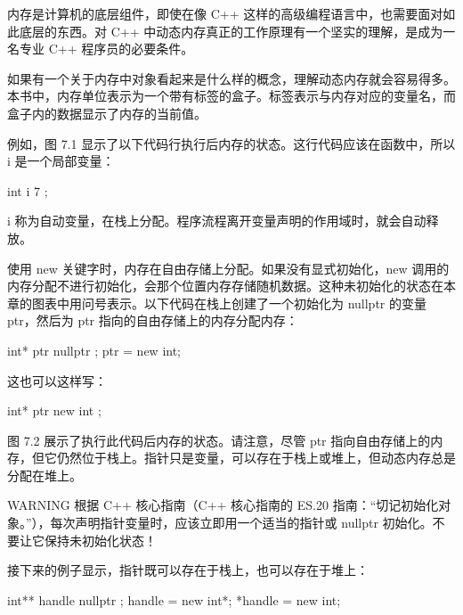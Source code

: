 
内存是计算机的底层组件，即使在像 C++ 这样的高级编程语言中，也需要面对如此底层的东西。对 C++ 中动态内存真正的工作原理有一个坚实的理解，是成为一名专业 C++ 程序员的必要条件。


如果有一个关于内存中对象看起来是什么样的概念，理解动态内存就会容易得多。本书中，内存单位表示为一个带有标签的盒子。标签表示与内存对应的变量名，而盒子内的数据显示了内存的当前值。

例如，图 7.1 显示了以下代码行执行后内存的状态。这行代码应该在函数中，所以 i 是一个局部变量：

\begin{cpp}
int i { 7 };
\end{cpp}


i 称为自动变量，在栈上分配。程序流程离开变量声明的作用域时，就会自动释放。

使用 new 关键字时，内存在自由存储上分配。如果没有显式初始化，new 调用的内存分配不进行初始化，会那个位置内存存储随机数据。这种未初始化的状态在本章的图表中用问号表示。以下代码在栈上创建了一个初始化为 nullptr 的变量 ptr，然后为 ptr 指向的自由存储上的内存分配内存：

\begin{cpp}
int* ptr { nullptr };
ptr = new int;
\end{cpp}

这也可以这样写：

\begin{cpp}
int* ptr { new int };
\end{cpp}


图 7.2 展示了执行此代码后内存的状态。请注意，尽管 ptr 指向自由存储上的内存，但它仍然位于栈上。指针只是变量，可以存在于栈上或堆上，但动态内存总是分配在堆上。

\begin{myWarning}{WARNING}
根据 C++ 核心指南（C++ 核心指南的 ES.20 指南：“切记初始化对象。”），每次声明指针变量时，应该立即用一个适当的指针或 nullptr 初始化。不要让它保持未初始化状态！
\end{myWarning}

接下来的例子显示，指针既可以存在于栈上，也可以存在于堆上：

\begin{cpp}
int** handle { nullptr };
handle = new int*;
*handle = new int;
\end{cpp}

